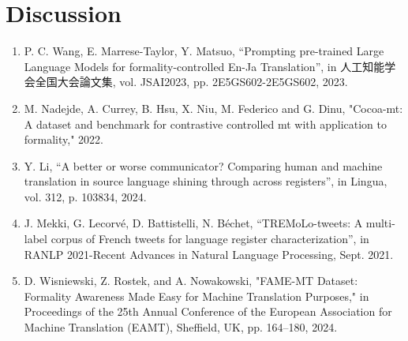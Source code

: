 \documentclass[fleqn,moreauthors,10pt]{ds_report}
\begin{document}
		
		
		
		
		
		\section*{Discussion}
		
		

		
		
		
		
		
		
		\renewcommand{\labelenumi}{[\theenumi]}
		\begin{enumerate}
			\item  P. C. Wang, E. Marrese-Taylor, Y. Matsuo, “Prompting pre-trained Large Language Models for formality-controlled En-Ja Translation”, in 人工知能学会全国大会論文集, vol. JSAI2023, pp. 2E5GS602-2E5GS602, 2023.
			\item M. Nadejde, A. Currey, B. Hsu, X. Niu, M. Federico and G. Dinu, "Cocoa-mt: A dataset and benchmark for contrastive controlled mt with application to formality," 2022.
			\item Y. Li, “A better or worse communicator? Comparing human and machine translation in source language shining through across registers”, in Lingua, vol. 312, p. 103834, 2024.
			\item J. Mekki, G. Lecorvé, D. Battistelli, N. Béchet, “TREMoLo-tweets: A multi-label corpus of French tweets for language register characterization”, in RANLP 2021-Recent Advances in Natural Language Processing, Sept. 2021.
			\item D. Wisniewski, Z. Rostek, and A. Nowakowski, "FAME-MT Dataset: Formality Awareness Made Easy for Machine Translation Purposes," in Proceedings of the 25th Annual Conference of the European Association for Machine Translation (EAMT), Sheffield, UK, pp. 164–180, 2024.
		\end{enumerate}
		
		
	
\end{document}
